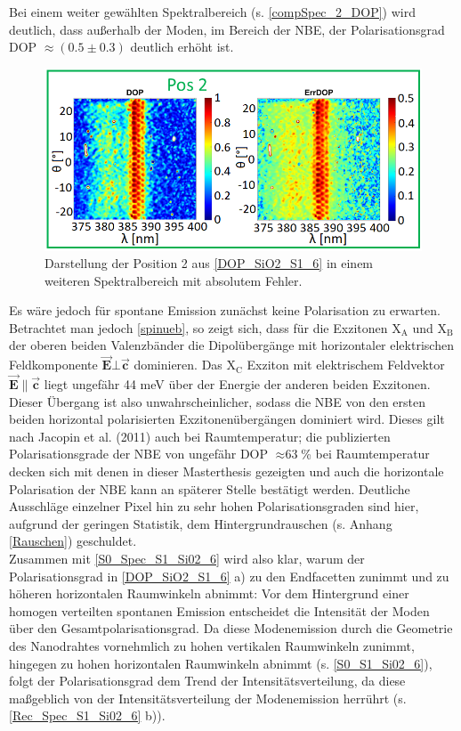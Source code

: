 Bei einem weiter gewählten Spektralbereich (s. \autoref{compSpec_2_DOP}) wird deutlich, dass außerhalb der Moden, im Bereich der NBE, der Polarisationsgrad DOP $\approx (\text{0.5} \pm \text{0.3})$ deutlich erhöht ist.\begin{figure}[h]
\includegraphics[width=.55\textwidth]{Bilder/SiO2/compSpec_2_DOP}
\caption{Darstellung der Position 2 aus \autoref{DOP_SiO2_S1_6} in einem weiteren Spektralbereich mit absolutem Fehler.}
\label{compSpec_2_DOP}
\end{figure}Es wäre jedoch für spontane Emission zunächst keine Polarisation zu erwarten. Betrachtet man jedoch \autoref{spinueb}, so zeigt sich, dass für die Exzitonen X$_\text{A}$ und X$_\text{B}$ der oberen beiden Valenzbänder die Dipolübergänge mit horizontaler elektrischen Feldkomponente $\vec{\textbf{E}} \bot \vec{\textbf{c}}$ dominieren. Das X$_\text{C}$ Exziton mit elektrischem Feldvektor $\vec{\textbf{E}} \| \vec{\textbf{c}}$ liegt ungefähr 44 meV über der Energie der anderen beiden Exzitonen. Dieser Übergang ist also unwahrscheinlicher, sodass die NBE von den ersten beiden horizontal polarisierten Exzitonenübergängen dominiert wird. Dieses gilt nach Jacopin et al. (2011) \cite{Jacopin.2011} auch bei Raumtemperatur; die publizierten Polarisationsgrade der NBE von ungefähr DOP $\approx \text{63}$\% bei Raumtemperatur decken sich mit denen in dieser Masterthesis gezeigten und auch die horizontale Polarisation der NBE kann an späterer Stelle bestätigt  werden. Deutliche Ausschläge einzelner Pixel hin zu sehr hohen Polarisationsgraden sind hier, aufgrund der geringen Statistik, dem Hintergrundrauschen (s. Anhang \autoref{Rauschen}) geschuldet.\\ 
Zusammen mit \autoref{S0_Spec_S1_Si02_6} wird also klar, warum der Polarisationsgrad in \autoref{DOP_SiO2_S1_6} a) zu den Endfacetten zunimmt und zu höheren horizontalen Raumwinkeln abnimmt: Vor dem Hintergrund einer homogen verteilten spontanen Emission entscheidet die Intensität der Moden über den Gesamtpolarisationsgrad. Da diese Modenemission durch die Geometrie des Nanodrahtes vornehmlich zu hohen vertikalen Raumwinkeln zunimmt, hingegen zu hohen horizontalen Raumwinkeln abnimmt (s. \autoref{S0_S1_Si02_6}), folgt der Polarisationsgrad dem Trend der Intensitätsverteilung, da diese maßgeblich von der Intensitätsverteilung der Modenemission herrührt (s. \autoref{Rec_Spec_S1_Si02_6} b)).
